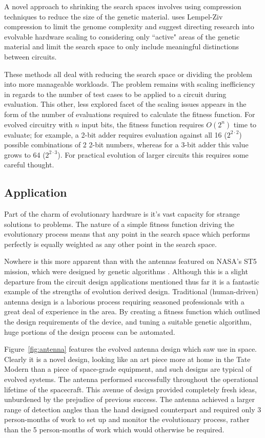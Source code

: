 A novel approach to shrinking the search spaces involves using compression
techniques to reduce the size of the genetic material. \cite{1508485} uses
Lempel-Ziv compression to limit the genome complexity and suggest directing
research into evolvable hardware scaling to considering only ``active" areas
of the genetic material and limit the search space to only include meaningful
distinctions between circuits.

These methods all deal with reducing the search space or dividing the problem into
more manageable workloads. The problem remains with scaling inefficiency in
regards to the number of test cases to be applied to a circuit during evaluation.
This other, less explored facet of the scaling issues appears in the form of the number of
evaluations required to calculate the fitness function. For evolved circuitry
with $n$ input bits, the fitness function requires $O(2^{n})$ time to evaluate;
for example, a 2-bit adder requires evaluation against all 16 ($2^{2 \cdot 2}$) possible combinations
of 2 2-bit numbers, whereas for a 3-bit adder this value grows to 64 ($2^{2 \cdot 3}$).
For practical evolution of larger circuits this requires some careful thought.


\subsection{Application}

Part of the charm of evolutionary hardware is it's vast capacity for strange
solutions
to problems. The nature of a simple fitness function driving the evolutionary
process means that any point in the search space which performs perfectly is
equally weighted as any other point in the search space.

Nowhere is this more apparent than with the antennas featured on NASA's ST5 mission,
which were designed by genetic algorithms \cite{Antenna}. Although
this is a slight departure from the circuit design applications mentioned thus
far it is a fantastic example of the strengths of evolution derived design.
Traditional (human-driven) antenna design is a laborious process requiring
seasoned professionals with a great deal of experience in the area. By creating
a fitness function which outlined the design requirements of the device, and
tuning a suitable genetic algorithm, huge portions of the design process can
be automated.

Figure~\ref{fig:antenna} features the evolved antenna design which
saw use in space. Clearly it is a novel design, looking like an art piece
more at home in the Tate Modern than a piece of space-grade equipment, and such
designs are typical of evolved systems. The antenna performed successfully
throughout the operational lifetime of the spacecraft. This avenue of design
provided completely fresh ideas, unburdened by the prejudice of previous
success. The antenna achieved a larger range of detection angles than the
hand designed counterpart and required only 3 person-months of work to set up and
monitor the evolutionary process, rather than the 5 person-months of work which
would otherwise be required.

